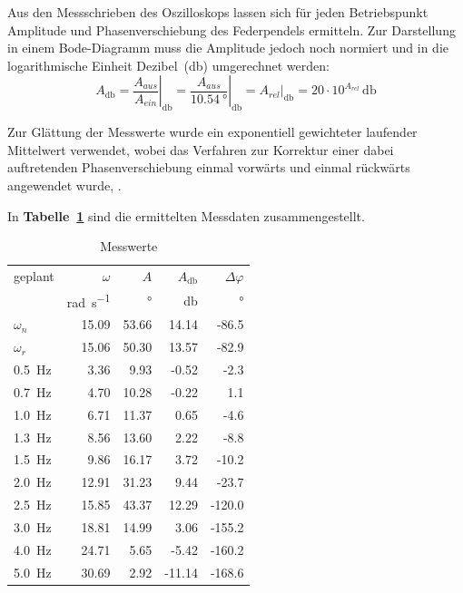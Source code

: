 \documentclass[a4paper,12pt]{scrartcl}
\begin{document}
Aus den Messschrieben des Oszilloskops lassen sich für jeden Betriebspunkt Amplitude und Phasenverschiebung des Federpendels ermitteln.
Zur Darstellung in einem Bode-Diagramm muss die Amplitude jedoch noch normiert und in die logarithmische Einheit Dezibel~(\si{\decibel}) umgerechnet werden:
\begin{equation}
	A_{\si{\decibel}} = \left.\frac{A_{aus}}{A_{ein}}\right\rvert_{\si{\decibel}}
		= \left.\frac{A_{aus}}{\SI{10.54}{\degree}}\right\rvert_{\si{\decibel}}
		= \left.A_{rel}\right\rvert_{\si{\decibel}}
		= 20 \cdot 10^{A_{rel}} \, \si{\decibel}
\end{equation}

Zur Glättung der Messwerte wurde ein exponentiell gewichteter laufender Mittelwert verwendet, wobei das Verfahren zur Korrektur einer dabei auftretenden Phasenverschiebung einmal vorwärts und einmal rückwärts angewendet wurde, \cite{ewma}.

In \textbf{Tabelle~\ref{tab:messwerte}} sind die ermittelten Messdaten zusammengestellt.
\begin{table}[h]
	\centering
	\caption{Messwerte}
	\label{tab:messwerte}
	\begin{tabular}{lrrrr}
	\toprule
	geplant           & $\omega$&     $A$ &   $A_{\si{\decibel}}$ & $\Delta \varphi$ \\
	  & \si{\radian\per\second} & \si{\degree} & \si{\decibel} & \si{\degree} \\
	\midrule
	$\omega_n$        &  15.09 &  53.66 &  14.14 &  -86.5 \\
	$\omega_r$        &  15.06 &  50.30 &  13.57 &  -82.9 \\
	\SI{0.5}{\hertz}  &   3.36 &   9.93 &  -0.52 &   -2.3 \\
	\SI{0.7}{\hertz}  &   4.70 &  10.28 &  -0.22 &    1.1 \\
	\SI{1.0}{\hertz}  &   6.71 &  11.37 &   0.65 &   -4.6 \\
	\SI{1.3}{\hertz}  &   8.56 &  13.60 &   2.22 &   -8.8 \\
	\SI{1.5}{\hertz}  &   9.86 &  16.17 &   3.72 &  -10.2 \\
	\SI{2.0}{\hertz}  &  12.91 &  31.23 &   9.44 &  -23.7 \\
	\SI{2.5}{\hertz}  &  15.85 &  43.37 &  12.29 & -120.0 \\
	\SI{3.0}{\hertz}  &  18.81 &  14.99 &   3.06 & -155.2 \\
	\SI{4.0}{\hertz}  &  24.71 &   5.65 &  -5.42 & -160.2 \\
	\SI{5.0}{\hertz}  &  30.69 &   2.92 & -11.14 & -168.6 \\
	\bottomrule
	\end{tabular}
\end{table}
\end{document}
